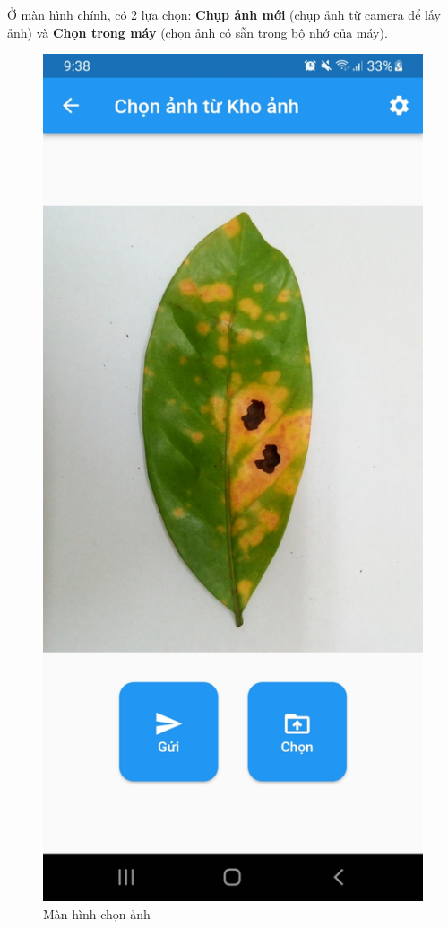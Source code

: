 \documentclass[a4paper,14pt]{extarticle}
\begin{document}
	Ở màn hình chính, có 2 lựa chọn: \textbf{Chụp ảnh mới} (chụp ảnh từ camera để lấy ảnh) và \textbf{Chọn trong máy} (chọn ảnh có sẵn trong bộ nhớ của máy).

	\begin{figure}[H]
		\centering
		\includegraphics[scale=0.1]{images/screenshot3.jpg}
		\caption{Màn hình chọn ảnh}
	\end{figure}
\end{document}
